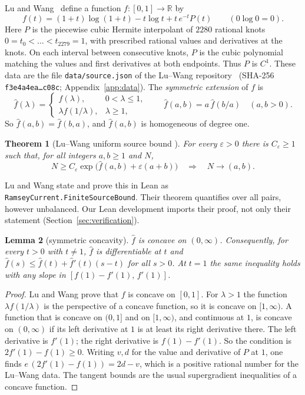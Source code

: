 \documentclass[11pt]{article}
\newtheorem{theorem}{Theorem}[section]
\newtheorem{lemma}[theorem]{Lemma}
\theoremstyle{definition}
\theoremstyle{remark}
\newcommand{\R}{\mathbb{R}}
\newcommand{\fh}{\widehat f}
\newcommand{\arrow}{\longrightarrow}
\begin{document}
Lu and Wang~\cite{LW} define a function $f:[0,1]\to\R$ by
\[
f(t)=(1+t)\log(1+t)-t\log t+t\,e^{-t}P(t)\qquad(0\log0=0).
\]
Here $P$ is the piecewise cubic Hermite interpolant of $2280$ rational knots $0=t_0<\dots<t_{2279}=1$, with prescribed
rational values and derivatives at the knots. On each interval between consecutive knots, $P$ is the cubic
polynomial matching the values and first derivatives at both endpoints. Thus $P$ is $C^1$.
These data are the file \texttt{data/source.json} of the Lu--Wang
repository~\cite{LWcode} (SHA-256 \texttt{f3e4a4ea\ldots c08c}; Appendix~\ref{app:data}). The
\emph{symmetric extension} of $f$ is
\[
\fh(\lambda)=\begin{cases}f(\lambda),&0<\lambda\le1,\\ \lambda f(1/\lambda),&\lambda\ge1,\end{cases}\qquad
\fh(a,b)=a\,\fh(b/a)\quad(a,b>0).
\]
So $\fh(a,b)=\fh(b,a)$, and $\fh(a,b)$ is homogeneous of degree one.

\begin{theorem}[Lu--Wang uniform source bound {\cite[eq.~(32), Lemma B.1]{LW}}]\label{thm:LW}
For every $\varepsilon>0$ there is $C_\varepsilon\ge1$ such that, for all integers $a,b\ge1$ and $N$,
\[
N\ge C_\varepsilon\exp\big(\fh(a,b)+\varepsilon(a+b)\big)\quad\Longrightarrow\quad N\arrow(a,b).
\]
\end{theorem}

Lu and Wang state and prove this in Lean as \texttt{RamseyCurrent.FiniteSourceBound}. Their theorem quantifies over
all pairs, however unbalanced. Our Lean development imports their proof, not only their statement
(Section~\ref{sec:verification}).

\begin{lemma}[symmetric concavity]\label{lem:concave}
$\fh$ is concave on $(0,\infty)$. Consequently, for every $t>0$ with $t\ne1$, $\fh$ is differentiable at $t$ and
$\fh(s)\le\fh(t)+\fh'(t)(s-t)$ for all $s>0$. At $t=1$ the same inequality holds with any slope in
$[f(1)-f'(1),\,f'(1)]$.
\end{lemma}

\begin{proof}
Lu and Wang prove that $f$ is concave on $[0,1]$. For $\lambda>1$ the function $\lambda f(1/\lambda)$ is the
perspective of a concave function, so it is concave on $[1,\infty)$. A function that is concave on $(0,1]$ and on
$[1,\infty)$, and continuous at $1$, is concave on $(0,\infty)$ if its left derivative at $1$ is at least its right
derivative there. The left derivative is $f'(1)$; the right derivative is $f(1)-f'(1)$. So the condition is
$2f'(1)-f(1)\ge0$. Writing $v,d$ for the value and derivative of $P$ at $1$, one finds
$e\,(2f'(1)-f(1))=2d-v$, which is a positive rational number for the Lu--Wang data. The tangent bounds are the usual
supergradient inequalities of a concave function.
\end{proof}
\end{document}
